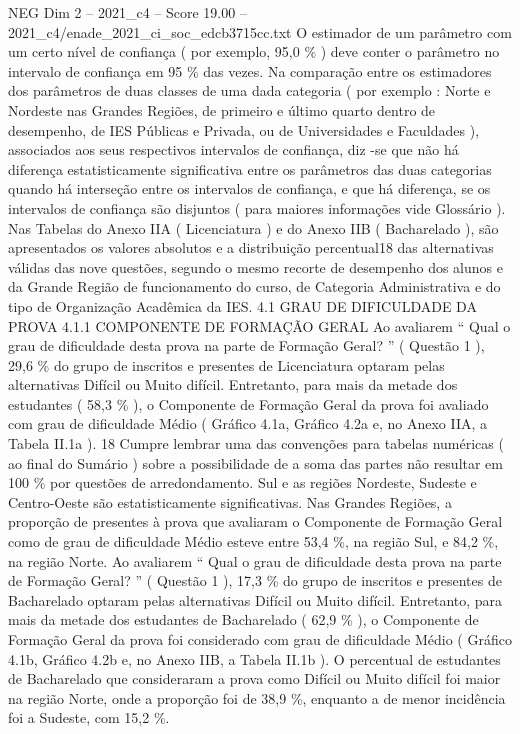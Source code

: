 \begin{textsample}{NEG Dim 2 – 2021\_c4 – Score 19.00 – 2021\_c4/enade\_2021\_ci\_soc\_edcb3715cc.txt}
O estimador de um parâmetro com um certo nível de confiança ( por exemplo, 95,0 \% ) deve conter o parâmetro no intervalo de confiança em 95 \% das vezes.
Na comparação entre os estimadores dos parâmetros de duas classes de uma dada categoria ( por exemplo : Norte e Nordeste nas Grandes Regiões, de primeiro e último quarto dentro de desempenho, de IES Públicas e Privada, ou de Universidades e Faculdades ), associados aos seus respectivos intervalos de confiança, diz -se que não há diferença estatisticamente significativa entre os parâmetros das duas categorias quando há interseção entre os intervalos de confiança, e que há diferença, se os intervalos de confiança são disjuntos ( para maiores informações vide Glossário ).
Nas Tabelas do Anexo IIA ( Licenciatura ) e do Anexo IIB ( Bacharelado ), são apresentados os valores absolutos e a distribuição percentual18 das alternativas válidas das nove questões, segundo o mesmo recorte de desempenho dos alunos e da Grande Região de funcionamento do curso, de Categoria Administrativa e do tipo de Organização Acadêmica da IES. 4.1 GRAU DE DIFICULDADE DA PROVA 4.1.1 COMPONENTE DE FORMAÇÃO GERAL Ao avaliarem “ Qual o grau de dificuldade desta prova na parte de Formação Geral? ” ( Questão 1 ), 29,6 \% do grupo de inscritos e presentes de Licenciatura optaram pelas alternativas Difícil ou Muito difícil.
Entretanto, para mais da metade dos estudantes ( 58,3 \% ), o Componente de Formação Geral da prova foi avaliado com grau de dificuldade Médio ( Gráfico 4.1a, Gráfico 4.2a e, no Anexo IIA, a Tabela II.1a ). 18 Cumpre lembrar uma das convenções para tabelas numéricas ( ao final do Sumário ) sobre a possibilidade de a soma das partes não resultar em 100 \% por questões de arredondamento.
Sul e as regiões Nordeste, Sudeste e Centro-Oeste são estatisticamente significativas.
Nas Grandes Regiões, a proporção de presentes à prova que avaliaram o Componente de Formação Geral como de grau de dificuldade Médio esteve entre 53,4 \%, na região Sul, e 84,2 \%, na região Norte.
Ao avaliarem “ Qual o grau de dificuldade desta prova na parte de Formação Geral? ” ( Questão 1 ), 17,3 \% do grupo de inscritos e presentes de Bacharelado optaram pelas alternativas Difícil ou Muito difícil.
Entretanto, para mais da metade dos estudantes de Bacharelado ( 62,9 \% ), o Componente de Formação Geral da prova foi considerado com grau de dificuldade Médio ( Gráfico 4.1b, Gráfico 4.2b e, no Anexo IIB, a Tabela II.1b ).
O percentual de estudantes de Bacharelado que consideraram a prova como Difícil ou Muito difícil foi maior na região Norte, onde a proporção foi de 38,9 \%, enquanto a de menor incidência foi a Sudeste, com 15,2 \%.

\end{textsample}
